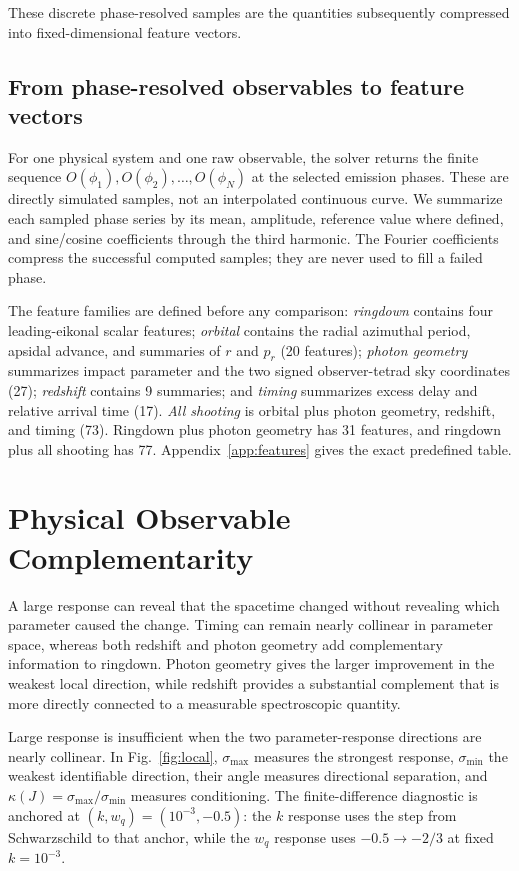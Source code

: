 \documentclass[11pt]{article}
\newcommand{\wq}{w_q}
\newcommand{\smin}{\sigma_{\min}}
\newcommand{\kappaJ}{\kappa(J)}
\begin{document}
\FloatBarrier

These discrete phase-resolved samples are the quantities subsequently
compressed into fixed-dimensional feature vectors.

\subsection{From phase-resolved observables to feature vectors}
For one physical system and one raw observable, the solver returns the finite
sequence $O(\phi_1),O(\phi_2),\ldots,O(\phi_N)$ at the selected emission
phases. These are directly simulated samples, not an interpolated continuous
curve. We summarize each sampled phase series by its mean, amplitude,
reference value where defined, and sine/cosine coefficients through the third
harmonic. The Fourier coefficients compress the successful computed samples;
they are never used to fill a failed phase.

The feature families are defined before any comparison: \emph{ringdown}
contains four leading-eikonal scalar features; \emph{orbital} contains the
radial azimuthal period, apsidal advance, and summaries of $r$ and $p_r$ (20
features); \emph{photon geometry} summarizes impact parameter and the two
signed observer-tetrad sky coordinates (27); \emph{redshift} contains 9
summaries; and \emph{timing} summarizes excess delay and relative arrival time
(17). \emph{All shooting} is orbital plus photon geometry, redshift, and
timing (73). Ringdown plus photon geometry has 31 features, and ringdown plus
all shooting has 77. Appendix~\ref{app:features} gives the exact predefined
table.

\section{Physical Observable Complementarity}
A large response can reveal that the spacetime changed without revealing which
parameter caused the change. Timing can remain nearly collinear in parameter
space, whereas both redshift and photon geometry add complementary information
to ringdown. Photon geometry gives the larger improvement in the weakest local
direction, while redshift provides a substantial complement that is more
directly connected to a measurable spectroscopic quantity.

Large response is insufficient when the two parameter-response directions are
nearly collinear. In Fig.~\ref{fig:local}, $\sigma_{\max}$ measures the
strongest response, $\smin$ the weakest identifiable direction, their angle
measures directional separation, and $\kappaJ=\sigma_{\max}/\smin$ measures
conditioning. The finite-difference diagnostic is anchored at
$(k,\wq)=(10^{-3},-0.5)$: the $k$ response uses the step from Schwarzschild to
that anchor, while the $\wq$ response uses $-0.5\to-2/3$ at fixed $k=10^{-3}$.
\end{document}
